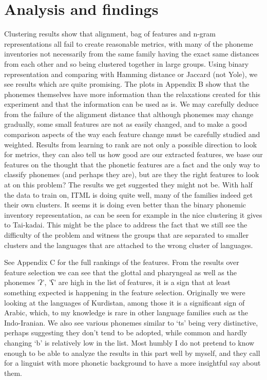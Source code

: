 \documentclass[letterpaper, 11pt]{article}
\begin{document}
\section{Analysis and findings}
Clustering results show that alignment, bag of features and n-gram representations all fail to create reasonable metrics, with many of the phoneme inventories not necessarily from the same family having the exact same distances from each other and so being clustered together in large groups. Using binary representation and comparing with Hamming distance or Jaccard (not Yole), we see results which are quite promising. The plots in Appendix B show that the phonemes themselves have more information than the relaxations created for this experiment and that the information can be used as is.
We may carefully deduce from the failure of the alignment distance that although phonemes may change gradually, some small features are not as easily changed, and to make a good comparison aspects of the way each feature change must be carefully studied and weighted.
Results from learning to rank are not only a possible direction to look for metrics, they can also tell us how good are our extracted features, we base our features on the thought that the phonetic features are a fact and the only way to classify phonemes (and perhaps they are), but are they the right features to look at on this problem? The results we get suggested they might not be. With half the data to train on, ITML is doing quite well, many of the families indeed get their own clusters. It seems it is doing even better than the binary phonemic inventory representation, as can be seen for example in the nice clustering it gives to Tai-kadai. 
This might be the place to address the fact that we still see the difficulty of the problem and witness the groups that are separated to smaller clusters and the languages that are attached to the wrong cluster of languages.

See Appendix C for the full rankings of the features. From the results over feature selection we can see that the glottal and pharyngeal as well as the phonemes 'ʔ', 'ʕ' are high in the list of features, it is a sign that at least something expected is happening in the feature selection. Originally we were looking at the languages of Kurdistan, among those it is a significant sign of Arabic, which, to my knowledge is rare in other language families such as the Indo-Iranian. We also see various phonemes similar to ‘ts’ being very distinctive, perhaps suggesting they don’t tend to be adopted, while common and hardly changing ‘b’ is relatively low in the list.
Most humbly I do not pretend to know enough to be able to analyze the results in this part well by myself, and they call for a linguist with more phonetic background to have a more insightful say about them.
\appendix
\end{document}
